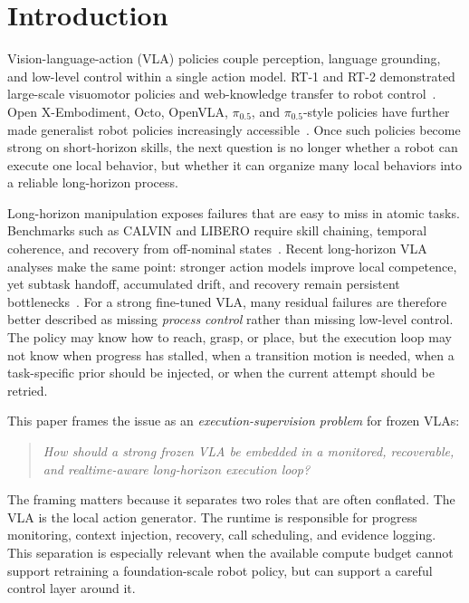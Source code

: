 \documentclass[runningheads]{waica}
\newcommand{\pizero}{$\pi_{0.5}$}
\begin{document}
\section{Introduction}
\label{sec:intro}

Vision-language-action (VLA) policies couple perception, language grounding, and low-level control within a single action model.
RT-1 and RT-2 demonstrated large-scale visuomotor policies and web-knowledge transfer to robot control~\cite{brohan2022rt1,brohan2023rt2}.
Open X-Embodiment, Octo, OpenVLA, \pizero{}, and \pizero{}-style policies have further made generalist robot policies increasingly accessible~\cite{oneill2023openx,octo2024octo,kim2024openvla,black2024pi0,physicalintelligence2025pi05}.
Once such policies become strong on short-horizon skills, the next question is no longer whether a robot can execute one local behavior, but whether it can organize many local behaviors into a reliable long-horizon process.

Long-horizon manipulation exposes failures that are easy to miss in atomic tasks.
Benchmarks such as CALVIN and LIBERO require skill chaining, temporal coherence, and recovery from off-nominal states~\cite{mees2021calvin,liu2023libero}.
Recent long-horizon VLA analyses make the same point: stronger action models improve local competence, yet subtask handoff, accumulated drift, and recovery remain persistent bottlenecks~\cite{fan2025longvla,han2025robocerebra}.
For a strong fine-tuned VLA, many residual failures are therefore better described as missing \emph{process control} rather than missing low-level control.
The policy may know how to reach, grasp, or place, but the execution loop may not know when progress has stalled, when a transition motion is needed, when a task-specific prior should be injected, or when the current attempt should be retried.

This paper frames the issue as an \emph{execution-supervision problem} for frozen VLAs:
\begin{quote}
\emph{How should a strong frozen VLA be embedded in a monitored, recoverable, and realtime-aware long-horizon execution loop?}
\end{quote}
The framing matters because it separates two roles that are often conflated.
The VLA is the local action generator.
The runtime is responsible for progress monitoring, context injection, recovery, call scheduling, and evidence logging.
This separation is especially relevant when the available compute budget cannot support retraining a foundation-scale robot policy, but can support a careful control layer around it.
\end{document}
